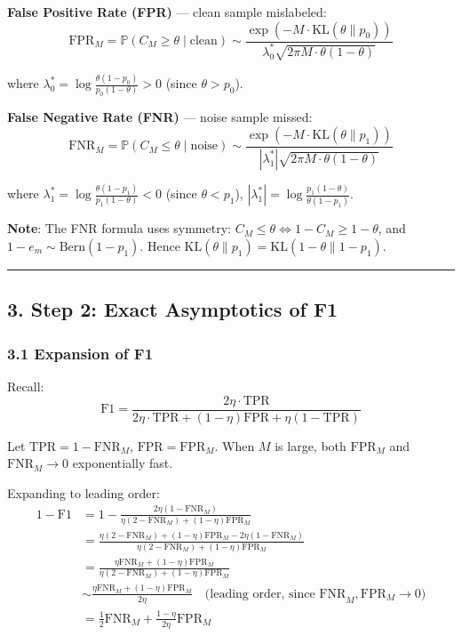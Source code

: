 \documentclass[
  12pt,
]{ctexart}
\begin{document}
\textbf{False Positive Rate (FPR)} --- clean sample mislabeled:
\[\text{FPR}_M = \mathbb{P}(C_M \geq \theta \mid \text{clean}) \sim \frac{\exp(-M \cdot \text{KL}(\theta \| p_0))}{\lambda_0^* \sqrt{2\pi M \cdot \theta(1-\theta)}}\]

where \(\lambda_0^* = \log\frac{\theta(1-p_0)}{p_0(1-\theta)} > 0\) (since \(\theta > p_0\)).

\textbf{False Negative Rate (FNR)} --- noise sample missed:
\[\text{FNR}_M = \mathbb{P}(C_M \leq \theta \mid \text{noise}) \sim \frac{\exp(-M \cdot \text{KL}(\theta \| p_1))}{|\lambda_1^*| \sqrt{2\pi M \cdot \theta(1-\theta)}}\]

where \(\lambda_1^* = \log\frac{\theta(1-p_1)}{p_1(1-\theta)} < 0\) (since \(\theta < p_1\)), \(|\lambda_1^*| = \log\frac{p_1(1-\theta)}{\theta(1-p_1)}\).

\textbf{Note}: The FNR formula uses symmetry: \(C_M \leq \theta \iff 1-C_M \geq 1-\theta\), and \(1-e_m \sim \text{Bern}(1-p_1)\). Hence \(\text{KL}(\theta \| p_1) = \text{KL}(1-\theta \| 1-p_1)\).

\begin{center}\rule{0.5\linewidth}{0.5pt}\end{center}

\subsection{3. Step 2: Exact Asymptotics of F1}\label{step-2-exact-asymptotics-of-f1}

\subsubsection{3.1 Expansion of F1}\label{expansion-of-f1}

Recall:
\[\text{F1} = \frac{2\eta \cdot \text{TPR}}{2\eta \cdot \text{TPR} + (1-\eta)\text{FPR} + \eta(1-\text{TPR})}\]

Let \(\text{TPR} = 1 - \text{FNR}_M\), \(\text{FPR} = \text{FPR}_M\). When \(M\) is large, both \(\text{FPR}_M\) and \(\text{FNR}_M \to 0\) exponentially fast.

Expanding to leading order:
\[\begin{aligned}
1 - \text{F1} &= 1 - \frac{2\eta(1-\text{FNR}_M)}{\eta(2-\text{FNR}_M) + (1-\eta)\text{FPR}_M} \\
&= \frac{\eta(2-\text{FNR}_M) + (1-\eta)\text{FPR}_M - 2\eta(1-\text{FNR}_M)}{\eta(2-\text{FNR}_M) + (1-\eta)\text{FPR}_M} \\
&= \frac{\eta\text{FNR}_M + (1-\eta)\text{FPR}_M}{\eta(2-\text{FNR}_M) + (1-\eta)\text{FPR}_M} \\
&\sim \frac{\eta\text{FNR}_M + (1-\eta)\text{FPR}_M}{2\eta} \quad \text{(leading order, since FNR}_M, \text{FPR}_M \to 0\text{)} \\
&= \frac{1}{2}\text{FNR}_M + \frac{1-\eta}{2\eta}\text{FPR}_M
\end{aligned}\]
\end{document}
